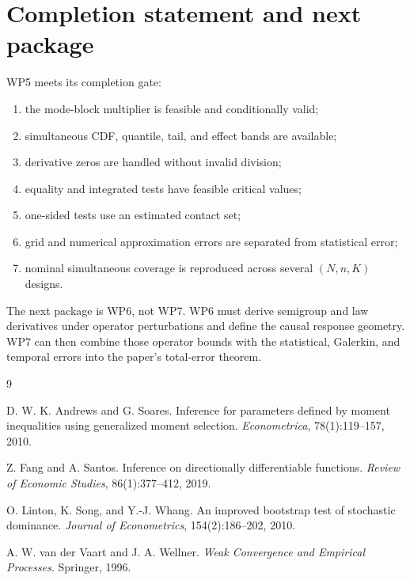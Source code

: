 \documentclass[11pt]{article}
\theoremstyle{remark}
\begin{document}
\section{Completion statement and next package}

WP5 meets its completion gate:
\begin{enumerate}[label=(\roman*)]
 \item the mode-block multiplier is feasible and conditionally valid;
 \item simultaneous CDF, quantile, tail, and effect bands are available;
 \item derivative zeros are handled without invalid division;
 \item equality and integrated tests have feasible critical values;
 \item one-sided tests use an estimated contact set;
 \item grid and numerical approximation errors are separated from statistical error;
 \item nominal simultaneous coverage is reproduced across several $(N,n,K)$ designs.
\end{enumerate}

The next package is WP6, not WP7. WP6 must derive semigroup and law derivatives under operator perturbations and define the causal response geometry. WP7 can then combine those operator bounds with the statistical, Galerkin, and temporal errors into the paper's total-error theorem.

\begin{thebibliography}{9}

D. W. K. Andrews and G. Soares.
\newblock Inference for parameters defined by moment inequalities using generalized moment selection.
\newblock \emph{Econometrica}, 78(1):119--157, 2010.

Z. Fang and A. Santos.
\newblock Inference on directionally differentiable functions.
\newblock \emph{Review of Economic Studies}, 86(1):377--412, 2019.

O. Linton, K. Song, and Y.-J. Whang.
\newblock An improved bootstrap test of stochastic dominance.
\newblock \emph{Journal of Econometrics}, 154(2):186--202, 2010.

A. W. van der Vaart and J. A. Wellner.
\newblock \emph{Weak Convergence and Empirical Processes}.
\newblock Springer, 1996.

\end{thebibliography}
\end{document}
